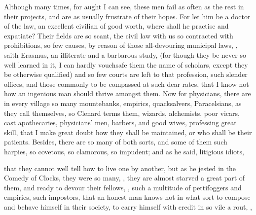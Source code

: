 Although many times, for aught I can see, these men fail as often as the rest
in their projects, and are as usually frustrate of their hopes. For let him be
a doctor of the law, an excellent civilian of good worth, where shall he
practise and expatiate? Their fields are so scant, the civil law with us so
contracted with prohibitions, so few causes, by reason of those all-devouring
municipal laws, , saith
Erasmus, an illiterate and a barbarous study, (for though
they be never so well learned in it, I can hardly vouchsafe them the name of
scholars, except they be otherwise qualified) and so few courts are left to
that profession, such slender offices, and those commonly to be compassed at
such dear rates, that I know not how an ingenious man should thrive amongst
them. Now for physicians, there are in every village so many mountebanks,
empirics, quacksalvers, Paracelsians, as they call themselves,  so Clenard terms them, wizards, alchemists,
poor vicars, cast apothecaries, physicians' men, barbers, and good wives,
professing great skill, that I make great doubt how they shall be maintained,
or who shall be their patients. Besides, there are so many of both sorts, and
some of them such harpies, so covetous, so clamorous, so impudent; and as
he said, litigious idiots,

%
that they cannot well tell how to live one by another, but as he jested in the
Comedy of Clocks, they were so many, , they are almost starved a great part of them, and ready to
devour their fellows, , such a multitude of pettifoggers and empirics, such impostors, that
an honest man knows not in what sort to compose and behave himself in their
society, to carry himself with credit in so vile a rout, , \etc{}

